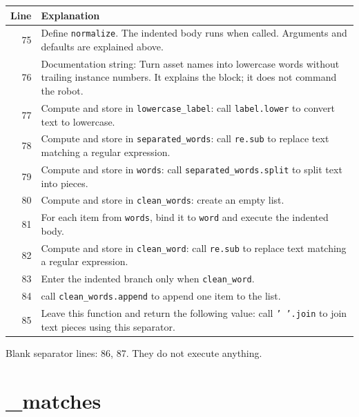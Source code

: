 \documentclass[11pt,a4paper]{book}
\begin{document}
\begin{longtable}{r p{}}

\textbf{Line} & \textbf{Explanation} \\ \hline \endhead

75 & Define \texttt{normalize}. The indented body runs when called. Arguments and defaults are explained above. \\

76 & Documentation string: Turn asset names into lowercase words without trailing instance numbers. It explains the block; it does not command the robot. \\

77 & Compute and store in \texttt{lowercase\_label}: call \texttt{label.lower} to convert text to lowercase.  \\

78 & Compute and store in \texttt{separated\_words}: call \texttt{re.sub} to replace text matching a regular expression.  \\

79 & Compute and store in \texttt{words}: call \texttt{separated\_words.split} to split text into pieces.  \\

80 & Compute and store in \texttt{clean\_words}: create an empty list.  \\

81 & For each item from \texttt{words}, bind it to \texttt{word} and execute the indented body. \\

82 & Compute and store in \texttt{clean\_word}: call \texttt{re.sub} to replace text matching a regular expression.  \\

83 & Enter the indented branch only when \texttt{clean\_word}. \\

84 & call \texttt{clean\_words.append} to append one item to the list. \\

85 & Leave this function and return the following value: call \texttt{' '.join} to join text pieces using this separator. \\

\end{longtable}

Blank separator lines: 86, 87. They do not execute anything.

\section{\_matches}
\end{document}

